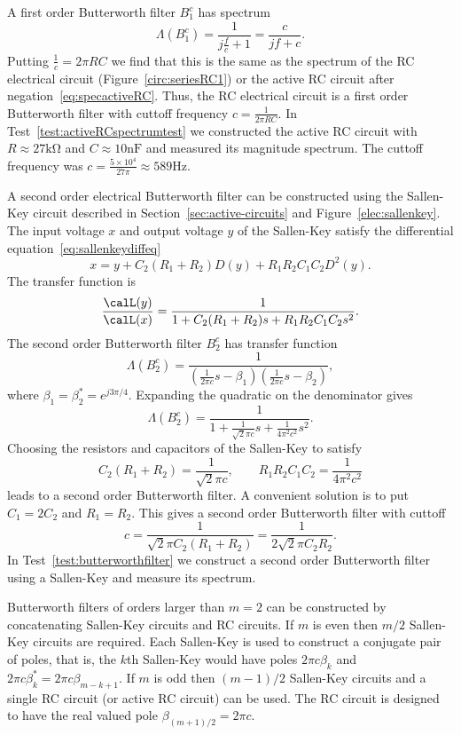 \documentclass[11pt,a4paper]{book}
\theoremstyle{plain}
\numberwithin{equation}{section}
\newcounter{test}
\begin{document}
A first order Butterworth filter $B_1^c$ has spectrum 
\[
\Lambda(B_1^c) = \frac{1}{j\tfrac{f}{c} + 1} = \frac{c}{jf + c}.
\]  
Putting $\tfrac{1}{c} = 2\pi RC$ we find that this is the same as the spectrum of the RC electrical circuit (Figure~\ref{circ:seriesRC1}) or the active RC circuit after negation~\eqref{eq:specactiveRC}.  Thus, the RC electrical circuit is a first order Butterworth filter with cuttoff frequency $c = \tfrac{1}{2\pi RC}$.  In Test~\ref{test:activeRCspectrumtest} we constructed the active RC circuit with $R \approx 27\si{\kilo\ohm}$ and $C \approx 10\si{\nano\farad}$ and measured its magnitude spectrum.  The cuttoff frequency was $c = \tfrac{5\times10^4}{27\pi} \approx 589\si{\hertz}$.

A second order electrical Butterworth filter can be constructed using the Sallen-Key circuit described in Section~\ref{sec:active-circuits} and Figure~\ref{elec:sallenkey}.  The input voltage $x$ and output voltage $y$ of the Sallen-Key satisfy the differential equation~\eqref{eq:sallenkeydiffeq}
\[
x = y + C_2(R_1 + R_2) D(y) + R_1 R_2 C_1 C_2 D^2(y).
\]
The transfer function is
\[
\frac{\calL(y)}{\calL(x)} = \frac{1}{1 + C_2(R_1 + R_2) s + R_1 R_2 C_1 C_2 s^2}.
\]
The second order Butterworth filter $B_2^c$ has transfer function
\[
\Lambda(B_2^c) = \frac{1}{(\tfrac{1}{2\pi c}s - \beta_1)(\tfrac{1}{2\pi c}s - \beta_2)},
\]
where $\beta_1 = \beta_2^* = e^{j3\pi/4}$.  Expanding the quadratic on the denominator gives
\[
\Lambda(B_2^c) = \frac{1}{1 + \tfrac{1}{\sqrt{2} \pi c} s + \tfrac{1}{4\pi^2 c^2} s^2}.
\]
Choosing the resistors and capacitors of the Sallen-Key to satisfy 
\[
C_2(R_1 + R_2) = \frac{1}{ \sqrt{2} \pi c}, \qquad R_1 R_2 C_1 C_2 = \frac{1}{4\pi^2 c^2}
\]
leads to a second order Butterworth filter.  A convenient solution is to put $C_1 = 2C_2$ and $R_1 = R_2$.  This gives a second order Butterworth filter with cuttoff
\[
c = \frac{1}{\sqrt{2} \pi C_2(R_1+R_2)} =  \frac{1}{2\sqrt{2} \pi C_2 R_2}.
\]
In Test~\ref{test:butterworthfilter} we construct a second order Butterworth filter using a Sallen-Key and measure its spectrum.

Butterworth filters of orders larger than $m=2$ can be constructed by concatenating Sallen-Key circuits and RC circuits.  If $m$ is even then $m/2$ Sallen-Key circuits are required.  Each Sallen-Key is used to construct a conjugate pair of poles, that is, the $k$th Sallen-Key would have poles $2\pi c\beta_k$ and $2\pi c\beta_k^* = 2\pi c \beta_{m-k+1}$.  If $m$ is odd then $(m-1)/2$ Sallen-Key circuits and a single RC circuit (or active RC circuit) can be used.  The RC circuit is designed to have the real valued pole $\beta_{(m+1)/2} = 2\pi c$.
\end{document}
